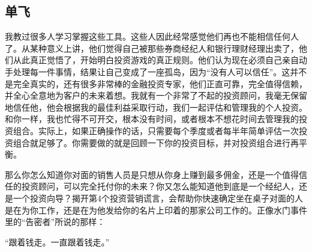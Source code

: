 \subsection{单飞}

我教过很多人学习掌握这些工具。这些人因此经常感觉他们再也不能相信任何人了。从某种意义上讲，他们觉得自己被那些券商经纪人和银行理财经理出卖了，他们从此真正觉悟了，开始明白投资游戏的真正规则。他们认为现在必须自己亲自动手处理每一件事情，结果让自己变成了一座孤岛，因为“没有人可以信任”。这并不是完全真实的，还有很多非常棒的金融投资专家，他们正直可靠，完全值得信赖，并全心全意地为客户的未来着想。我就有一个非常了不起的投资顾问，我毫无保留地信任他，他会根据我的最佳利益采取行动，我们一起评估和管理我的个人投资。和你一样，我也忙得不可开交，根本没有时间，或者根本不想花时间去管理我的投资组合。实际上，如果正确操作的话，只需要每个季度或者每半年简单评估一次投资组合就足够了。你需要做的就是回顾一下你的投资目标，并对投资组合进行再平衡。

那么你怎么知道你对面的销售人员是只想从你身上赚到最多佣金，还是一个值得信任的投资顾问，可以完全托付你的未来？你又怎么能知道他到底是一个经纪人，还是一个投资向导？揭开第4个投资营销谎言，会帮助你快速确定坐在桌子对面的人是在为你工作，还是在为他发给你的名片上印着的那家公司工作的。正像水门事件里的“告密者”所说的那样：

“跟着钱走。一直跟着钱走。”
